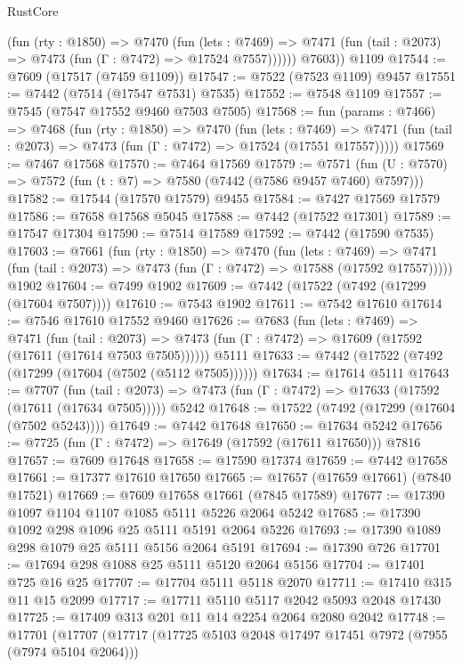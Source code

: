 \begin{lexlean}{RustCore}
\begin{coremodule}
            (fun (rty : @1850) =>
            @7470
              (fun (lets : @7469) =>
              @7471 (fun (tail : @2073) => @7473 (fun (Γ : @7472) => @17524 @7557))))))
        @7603))
    @1109
@17544 := @7609 (@17517 (@7459 @1109))
@17547 := @7522 (@7523 @1109) @9457
@17551 := @7442 (@7514 (@17547 @7531) @7535)
@17552 := @7548 @1109
@17557 := @7545 (@7547 @17552 @9460 @7503 @7505)
@17568 := fun (params : @7466) =>
  @7468
    (fun (rty : @1850) =>
    @7470
      (fun (lets : @7469) =>
      @7471 (fun (tail : @2073) => @7473 (fun (Γ : @7472) => @17524 (@17551 @17557)))))
@17569 := @7467 @17568
@17570 := @7464 @17569
@17579 := @7571 (fun (U : @7570) => @7572 (fun (t : @7) => @7580 (@7442 (@7586 @9457 @7460) @7597)))
@17582 := @17544 (@17570 @17579) @9455
@17584 := @7427 @17569 @17579
@17586 := @7658 @17568 @5045
@17588 := @7442 (@17522 @17301)
@17589 := @17547 @17304
@17590 := @7514 @17589
@17592 := @7442 (@17590 @7535)
@17603 := @7661
    (fun (rty : @1850) =>
    @7470
      (fun (lets : @7469) =>
      @7471 (fun (tail : @2073) => @7473 (fun (Γ : @7472) => @17588 (@17592 @17557)))))
    @1902
@17604 := @7499 @1902
@17609 := @7442 (@17522 (@7492 (@17299 (@17604 @7507))))
@17610 := @7543 @1902
@17611 := @7542 @17610
@17614 := @7546 @17610 @17552 @9460
@17626 := @7683
    (fun (lets : @7469) =>
    @7471
      (fun (tail : @2073) =>
      @7473 (fun (Γ : @7472) => @17609 (@17592 (@17611 (@17614 @7503 @7505))))))
    @5111
@17633 := @7442 (@17522 (@7492 (@17299 (@17604 (@7502 (@5112 @7505))))))
@17634 := @17614 @5111
@17643 := @7707
    (fun (tail : @2073) => @7473 (fun (Γ : @7472) => @17633 (@17592 (@17611 (@17634 @7505)))))
    @5242
@17648 := @17522 (@7492 (@17299 (@17604 (@7502 @5243))))
@17649 := @7442 @17648
@17650 := @17634 @5242
@17656 := @7725 (fun (Γ : @7472) => @17649 (@17592 (@17611 @17650))) @7816
@17657 := @7609 @17648
@17658 := @17590 @17374
@17659 := @7442 @17658
@17661 := @17377 @17610 @17650
@17665 := @17657 (@17659 @17661) (@7840 @17521)
@17669 := @7609 @17658 @17661 (@7845 @17589)
@17677 := @17390 @1097 @1104 @1107 @1085 @5111 @5226 @2064 @5242
@17685 := @17390 @1092 @298 @1096 @25 @5111 @5191 @2064 @5226
@17693 := @17390 @1089 @298 @1079 @25 @5111 @5156 @2064 @5191
@17694 := @17390 @726
@17701 := @17694 @298 @1088 @25 @5111 @5120 @2064 @5156
@17704 := @17401 @725 @16 @25
@17707 := @17704 @5111 @5118 @2070
@17711 := @17410 @315 @11 @15 @2099
@17717 := @17711 @5110 @5117 @2042 @5093 @2048 @17430
@17725 := @17409 @313 @201 @11 @14 @2254 @2064 @2080 @2042
@17748 := @17701
    (@17707
      (@17717
        (@17725 @5103 @2048 @17497 @17451 @7972 (@7955 (@7974 @5104 @2064)))

\end{coremodule}
\end{lexlean}
